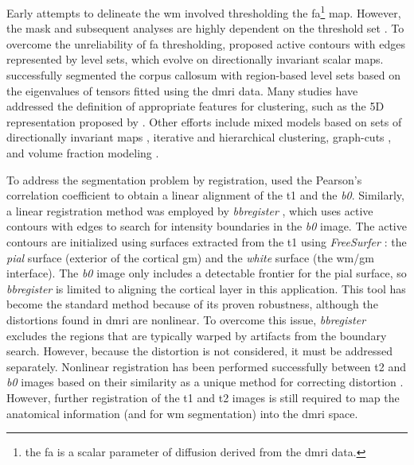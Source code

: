 \documentclass[3p,authoryear,fleqn]{elsarticle}
\begin{document}
Early attempts to delineate the \gls*{wm} involved thresholding the
  \gls*{fa}\footnote{the \gls*{fa} is a scalar parameter of diffusion derived from
  the \gls*{dmri} data.} map.
However, the mask and subsequent analyses are highly dependent on the threshold set
  \citep{taoka_fractional_2009}.
To overcome the unreliability of \gls*{fa} thresholding,
  \cite{zhukov_level_2003} proposed active contours with edges represented
  by level sets, which evolve on directionally invariant scalar maps.
\cite{rousson_level_2004} successfully segmented the corpus callosum with
  region-based level sets based on the eigenvalues of tensors fitted using the
  \gls*{dmri} data.
Many studies have addressed the definition of appropriate features for clustering,
  such as the 5D representation proposed by \cite{jonasson_segmentation_2005}.
Other efforts include mixed models based on sets of directionally invariant maps
  \citep{liu_brain_2007}, iterative \citep{hadjiprocopis_unbiased_2005} and
  hierarchical \citep{lu_segmentation_2008} clustering,
  graph-cuts \citep{han_experimental_2009},
  and volume fraction modeling \citep{kumazawa_improvement_2013}.

To address the segmentation problem by registration, \cite{saad_new_2009}
  used the Pearson's correlation coefficient to obtain a linear alignment of the \gls*{t1} and
  the \emph{b0}.
Similarly, a linear registration method was employed by \emph{bbregister} \citep{greve_accurate_2009},
  which uses active contours with edges to search for intensity boundaries in the \emph{b0}
  image.
The active contours are initialized using surfaces extracted from the
  \gls*{t1} using \emph{FreeSurfer} \citep{fischl_freesurfer_2012}:
  the \emph{pial} surface (exterior of the cortical \gls*{gm}) and the \emph{white}
  surface (the \gls*{wm}/\gls*{gm} interface).
The \emph{b0} image only includes a detectable frontier for the pial surface, so
  \emph{bbregister} is limited to aligning the cortical layer in this
  application.
This tool has become the standard method because of its proven robustness, although the
  distortions found in \gls*{dmri} are nonlinear.
To overcome this issue, \emph{bbregister} excludes the
  regions that are typically warped by artifacts from the boundary search.
However, because the distortion is not considered, it must be addressed separately.
Nonlinear registration has been performed successfully between \gls*{t2} and \emph{b0}
  images based on their similarity as a unique method for correcting distortion
  \citep{kybic_unwarping_2000,studholme_accurate_2000,wu_comparison_2008,tao_variational_2009}.
However, further registration of the \gls*{t1} and \gls*{t2} images is still required to map the anatomical
  information (and for \gls*{wm} segmentation) into the \gls*{dmri} space.
\end{document}
